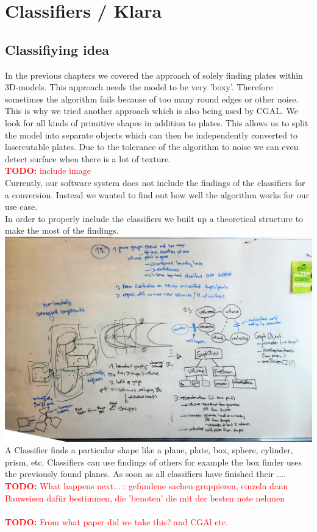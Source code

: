 \documentclass[../ClassicThesis.tex]{subfiles}
\begin{document}
\chapter{Classifiers / Klara}\label{ch:classifiers}
\newcommand{\TODO}[1]{\textcolor{red}{\\ \textbf{TODO:} #1 \\}}

\section{Classifiying idea}
In the previous chapters we covered the approach of solely finding plates within 3D-models. This approach needs the model to be very 'boxy'. Therefore sometimes the algorithm fails because of too many round edges or other noise. \\
This is why we tried another approach which is also being used by CGAL. We look for all kinds of primitive shapes in addition to plates. This allows us to split the model into separate objects which can then be independently converted to lasercutable plates. Due to the tolerance of the algorithm to noise we can even detect surface when there is a lot of texture. \TODO{include image}
Currently, our software system does not include the findings of the classifiers for a conversion. Instead we wanted to find out how well the algorithm works for our use case. \\
In order to properly include the classifiers we built up a theoretical structure to make the most of the findings. 
\includegraphics[width=0.5\columnwidth]{Images/10-classifiers-ClassificationStructureGraphBuilding.jpg}
A Classifier finds a particular shape like a plane, plate, box, sphere, cylinder, prism, etc. Classifiers can use findings of others for example the box finder uses the previously found planes. As soon as all classifiers have finished their .... \TODO{What happens next... : gefundene sachen gruppieren, einzeln dann Bauweisen dafür bestimmen, die 'benoten' die mit der besten note nehmen} 
\TODO{From what paper did we take this? and CGAl etc.}
\end{document}
